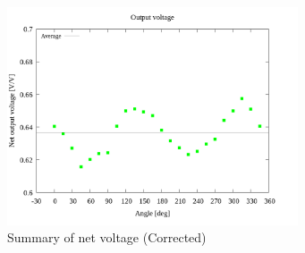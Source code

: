 \documentclass[twocolumn,a4j]{jsarticle}
\begin{document}
\begin{figure}[htbp]
    \footnotesize
    \begin{center}
        \includegraphics[width=86mm]{../graphes/1-ex/09/09_summary-outputvoltage-net.png}
        \caption{Summary of net voltage (Corrected)}
    \end{center}
\end{figure}
\end{document}
